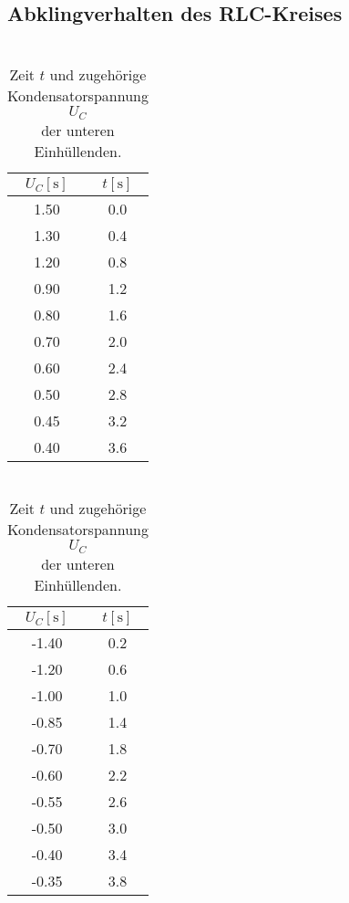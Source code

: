 \subsection{Abklingverhalten des RLC-Kreises}
\label{sec:Abklingverhalten}
\begin{table}[H]
  \begin{minipage}{0.48\linewidth}
    \centering
    \caption{\\Zeit $t$ und zugehörige\\ Kondensatorspannung $U_C$ \\der oberen Einhüllenden.}
    \begin{tabular}{c|c}
      \toprule
      {$U_C\left[\unit{\s}\right]$} & {$t\left[\unit{\s}\right]$}\\
      \midrule
      1.50 & 0.0 \\
      1.30 & 0.4 \\
      1.20 & 0.8 \\ 
      0.90 & 1.2 \\
      0.80 & 1.6 \\
      0.70 & 2.0 \\
      0.60 & 2.4 \\
      0.50 & 2.8 \\
      0.45 & 3.2 \\
      0.40 & 3.6 \\
      \bottomrule
    \end{tabular}
    \vspace{5pt}
    \label{tab:obere}
  \end{minipage}
  \begin{minipage}{0.48\linewidth}
    \centering
    \caption{\\Zeit $t$ und zugehörige\\ Kondensatorspannung $U_C$ \\der unteren Einhüllenden.}
    \begin{tabular}{c|c}
      \toprule
      {$U_C\left[\unit{\s}\right]$} & {$t\left[\unit{\s}\right]$}\\
      \midrule
      -1.40 & 0.2 \\
      -1.20 & 0.6 \\
      -1.00 & 1.0 \\
      -0.85 & 1.4 \\
      -0.70 & 1.8 \\
      -0.60 & 2.2 \\
      -0.55 & 2.6 \\
      -0.50 & 3.0 \\
      -0.40 & 3.4 \\
      -0.35 & 3.8 \\
      \bottomrule
    \end{tabular}
    \vspace{5pt}
    \label{tab:untere}
  \end{minipage}
\end{table}

